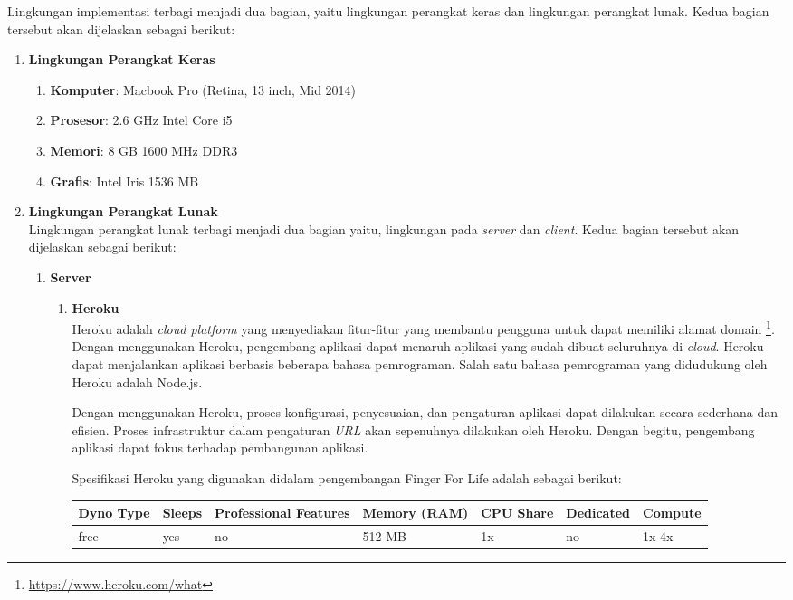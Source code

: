Lingkungan implementasi terbagi menjadi dua bagian, yaitu lingkungan perangkat keras dan lingkungan perangkat lunak. Kedua bagian tersebut akan dijelaskan sebagai berikut:
\begin{enumerate}
	\item \textbf{Lingkungan Perangkat Keras}
	\begin{enumerate}
		\item \textbf{Komputer}: Macbook Pro (Retina, 13 inch, Mid 2014)
		\item \textbf{Prosesor}: 2.6 GHz Intel Core i5
		\item \textbf{Memori}: 8 GB 1600 MHz DDR3
		\item \textbf{Grafis}: Intel Iris 1536 MB
	\end{enumerate}

	\item \textbf{Lingkungan Perangkat Lunak} \\
	Lingkungan perangkat lunak terbagi menjadi dua bagian yaitu, lingkungan pada \textit{server} dan \textit{client}. Kedua bagian tersebut akan dijelaskan sebagai berikut:
	\begin{enumerate}
		\item \textbf{Server}
		\begin{enumerate}
			\item \textbf{Heroku} \\
			Heroku adalah \textit{cloud platform} yang menyediakan fitur-fitur yang membantu pengguna untuk dapat memiliki alamat domain \footnote{\url{https://www.heroku.com/what}}. Dengan menggunakan Heroku, pengembang aplikasi dapat menaruh aplikasi yang sudah dibuat seluruhnya di \textit{cloud}. Heroku dapat menjalankan aplikasi berbasis beberapa bahasa pemrograman. Salah satu bahasa pemrograman yang didudukung oleh Heroku adalah Node.js.
			
			Dengan menggunakan Heroku, proses konfigurasi, penyesuaian, dan pengaturan aplikasi dapat dilakukan secara sederhana dan efisien. Proses infrastruktur dalam pengaturan \textit{URL} akan sepenuhnya dilakukan oleh Heroku. Dengan begitu, pengembang aplikasi dapat fokus terhadap pembangunan aplikasi.
			
			Spesifikasi Heroku yang digunakan didalam pengembangan Finger For Life adalah sebagai berikut:
			
			\begin{tabular}{ |p{1.5cm}|p{1.5cm}|p{2cm}|p{1.5cm}|p{1.5cm}|p{1.5cm}|p{1.5cm}|}
			\hline
			Dyno Type & Sleeps & Professional Features & Memory (RAM) & CPU Share & Dedicated & Compute \\ \hline
			free & yes & no & 512 MB & 1x & no & 1x-4x \\ \hline
				

\end{tabular}
\end{enumerate}
\end{enumerate}
\end{enumerate}
